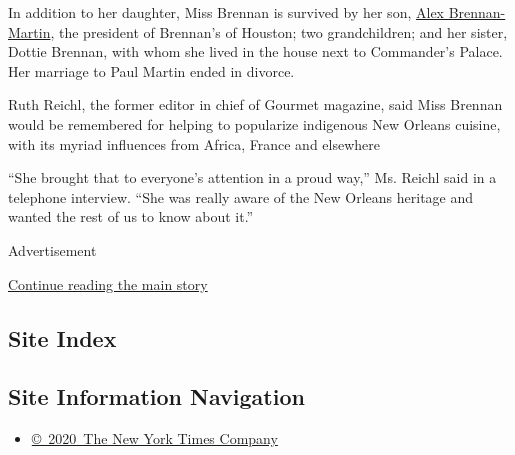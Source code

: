 In addition to her daughter, Miss Brennan is survived by her son,
\href{https://www.brennanshouston.com/alex-brennan-martin/}{Alex
Brennan-Martin}, the president of Brennan's of Houston; two
grandchildren; and her sister, Dottie Brennan, with whom she lived in
the house next to Commander's Palace. Her marriage to Paul Martin ended
in divorce.

Ruth Reichl, the former editor in chief of Gourmet magazine, said Miss
Brennan would be remembered for helping to popularize indigenous New
Orleans cuisine, with its myriad influences from Africa, France and
elsewhere

``She brought that to everyone's attention in a proud way,'' Ms. Reichl
said in a telephone interview. ``She was really aware of the New Orleans
heritage and wanted the rest of us to know about it.''

Advertisement

\protect\hyperlink{after-bottom}{Continue reading the main story}

\hypertarget{site-index}{%
\subsection{Site Index}\label{site-index}}

\hypertarget{site-information-navigation}{%
\subsection{Site Information
Navigation}\label{site-information-navigation}}

\begin{itemize}
\tightlist
\item
  \href{https://help.nytimes3xbfgragh.onion/hc/en-us/articles/115014792127-Copyright-notice}{©~2020~The
  New York Times Company}
\end{itemize}

